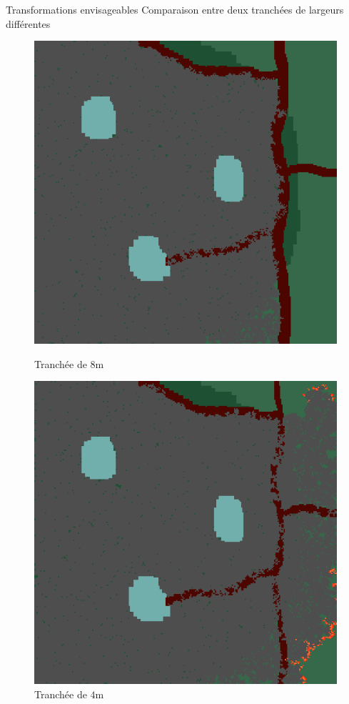 \documentclass{beamer}
\begin{document}
\begin{frame}{Transformations envisageables \hyperlink{jump}{\beamerbutton{ }} \hypertarget{17}{\beamerbutton{ }}}
    Comparaison entre deux tranchées de largeurs différentes
    
    \begin{figure}[!htb]
        \begin{minipage}{0.48\textwidth}
          \centering
          \includegraphics[width=.8\linewidth]{pictures/trans/treach.png}
          \caption{Tranchée de $8$m}\label{Fig:Data1}
        \end{minipage}\hfill
        \begin{minipage}{0.48\textwidth}
          \centering
          \includegraphics[width=.8\linewidth]{pictures/trans/little_treach.png}
          \caption{Tranchée de $4$m}\label{Fig:Data2}
        \end{minipage}
     \end{figure}
\end{frame}
\end{document}

